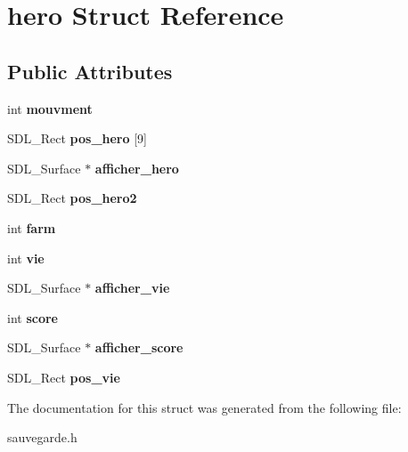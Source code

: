\hypertarget{structhero}{}\section{hero Struct Reference}
\label{structhero}
\subsection*{Public Attributes}
\begin{DoxyCompactItemize}
\item 
\mbox{\label{structhero_a2e29e9bbf40ce21c919020cab377c459}} 
int {\bfseries mouvment}
\item 
\mbox{\label{structhero_a3cf2835573057cabad180f997bb25f8e}} 
S\+D\+L\+\_\+\+Rect {\bfseries pos\+\_\+hero} \mbox{[}9\mbox{]}
\item 
\mbox{\label{structhero_a2911ee22606d636ab0440060972df5a6}} 
S\+D\+L\+\_\+\+Surface $\ast$ {\bfseries afficher\+\_\+hero}
\item 
\mbox{\label{structhero_ae21dc2bbecf1ef9b41ca5258ca0c4c9c}} 
S\+D\+L\+\_\+\+Rect {\bfseries pos\+\_\+hero2}
\item 
\mbox{\label{structhero_a864bf6a159fba501fca768cc17c5f7e4}} 
int {\bfseries farm}
\item 
\mbox{\label{structhero_a5887140c26217e8f45870ee09224ff94}} 
int {\bfseries vie}
\item 
\mbox{\label{structhero_aa0c881a3e44ec1177753198bbcb40502}} 
S\+D\+L\+\_\+\+Surface $\ast$ {\bfseries afficher\+\_\+vie}
\item 
\mbox{\label{structhero_ad95606e4c167095066a7d314620d99b5}} 
int {\bfseries score}
\item 
\mbox{\label{structhero_abf045ab06209db5a3a2d5282461a023d}} 
S\+D\+L\+\_\+\+Surface $\ast$ {\bfseries afficher\+\_\+score}
\item 
\mbox{\label{structhero_adbe4f5c90c7c4d99292c65d50dad02b7}} 
S\+D\+L\+\_\+\+Rect {\bfseries pos\+\_\+vie}
\end{DoxyCompactItemize}


The documentation for this struct was generated from the following file\+:\begin{DoxyCompactItemize}
\item 
sauvegarde.\+h\end{DoxyCompactItemize}
